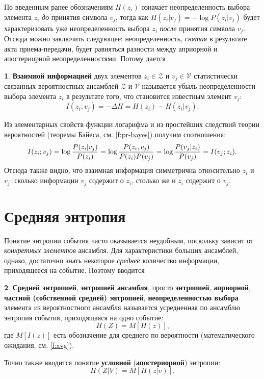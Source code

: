 \documentclass[12pt,a4paper,openright]{book}
\theoremstyle{definition}
\newtheorem{definition}{\textls[150]{Определение}}[chapter]
\numberwithin{equation}{chapter}
\begin{document}
	По введенным ранее обозначениям $H(z_i)$ означает неопределенность выбора элемента $z_i$ \textit{до} принятия символа $v_j$, тогда как $H(z_i | v_j) = - \log P(z_i | v_j)$ будет характеризовать уже неопределенность выбора $z_i$ \textit{после} принятия символа $v_j$. Отсюда можно заключить следующее: неопределенность, \textit{снятая} в результате акта приема-передачи, будет равняться разности между априорной и апостериорной неопределенностями. Потому дается
	\begin{definition}\label{d:information}
		\textbf{Взаимной информацией} двух элементов $z_i \in \mathcal{Z}$ и $v_j \in \mathcal{V}$ статистически связанных вероятностных ансамблей $\mathcal{Z}$ и $\mathcal{V}$ называется убыль неопределенности выбора элемента $z_i$ в результате того, что становится известным элемент $v_j$:
		\begin{equation}\label{f:information}
			I(z_i; v_j) = -\Delta H = H(z_i) - H(z_i | v_j) \text{.}
		\end{equation}
	\end{definition}
	Из элементарных свойств функции логарифма и из простейших следствий теории вероятностей (теоремы Байеса, см. \autoref{f:pr-bayes}) получим соотношения:
	\begin{equation}
		I(z_i; v_j) = \log {P(z_i | v_j) \over P(z_i)} = \log {P(z_i, v_j) \over {P(z_i) P(v_j)}} = \log {P(v_j | z_i) \over P(v_j)} = I(v_j; z_i) \text{.}
	\end{equation}
	Отсюда также видно, что взаимная информация симметрична относительно $z_i$ и $v_j$: сколько информации $v_j$ содержит о $z_i$, столько же и $z_i$ содержит о $v_j$.









	\section{Средняя энтропия}

	Понятие энтропии события часто оказывается неудобным, поскольку зависит от \textit{конкретных элементов} ансамбля. Для характеристики больших ансамблей, однако, достаточно знать некоторое \textit{среднее} количество информации, приходящееся на событие. Поэтому вводится
	\begin{definition}
		\textbf{Средней энтропией}, \textbf{энтропией ансамбля}, просто \textbf{энтропией}, \textbf{априорной}, \textbf{частной (собственной средней) энтропией}, \textbf{неопределенностью выбора} элемента из вероятностного ансамбля называется усредненная по ансамблю энтропия события, приходящаяся на одно событие:
		\begin{equation}
			H(Z) = M[H(z)] \text{,}
		\end{equation}
		где $M[I(z)]$ есть обозначение для среднего по вероятности (математического ожидания, см. \autoref{f:avg}).

		Точно также вводится понятие \textbf{условной} (\textbf{апостериорной}) энтропии:
		\begin{equation}
			H(Z | V) = M[H(z | v)] \text{.}
		\end{equation}
	\end{definition}
\end{document}
